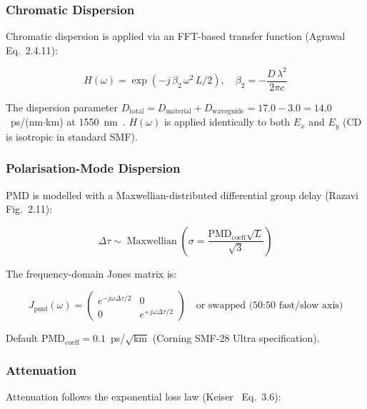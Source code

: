 \documentclass[11pt,a4paper]{article}
\begin{document}
\subsubsection{Chromatic Dispersion}

Chromatic dispersion is applied via an FFT-based transfer function
(Agrawal~\cite{agrawal5} Eq.~2.4.11):

\begin{equation}
  H(\omega) = \exp\!\left(-j\,\beta_2\,\omega^2\,L/2\right),
  \quad
  \beta_2 = -\frac{D\,\lambda^2}{2\pi c}
  \label{eq:cd}
\end{equation}

The dispersion parameter $D_{\text{total}} = D_{\text{material}} +
D_{\text{waveguide}} = 17.0 - 3.0 = 14.0$~ps/(nm$\cdot$km)
at 1550~nm~\cite{hui,keck}.  $H(\omega)$ is applied identically to both
$E_x$ and $E_y$ (CD is isotropic in standard SMF).

\subsubsection{Polarisation-Mode Dispersion}

PMD is modelled with a Maxwellian-distributed differential group delay
(Razavi~\cite{razavi} Fig.~2.11):

\begin{equation}
  \Delta\tau \sim \operatorname{Maxwellian}\!\left(\sigma =
    \frac{\text{PMD}_{\text{coeff}}\sqrt{L}}{\sqrt{3}}\right)
\end{equation}

The frequency-domain Jones matrix is:

\begin{equation}
  J_{\text{pmd}}(\omega) = \begin{pmatrix}
    e^{-j\omega\Delta\tau/2} & 0 \\
    0 & e^{+j\omega\Delta\tau/2}
  \end{pmatrix}
  \quad\text{or swapped (50:50 fast/slow axis)}
  \label{eq:pmd}
\end{equation}

Default $\text{PMD}_{\text{coeff}} = 0.1$~ps/$\sqrt{\text{km}}$
(Corning SMF-28 Ultra specification).

\subsubsection{Attenuation}

Attenuation follows the exponential loss law (Keiser~\cite{keiser} Eq.~3.6):
\end{document}
